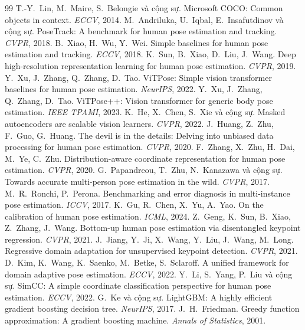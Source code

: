 \documentclass[11pt,a4paper]{article}
\begin{document}
\begin{thebibliography}{99}\small
{} T.-Y.~Lin, M.~Maire, S.~Belongie và cộng sự. Microsoft COCO: Common objects in context. \textit{ECCV}, 2014.
 M.~Andriluka, U.~Iqbal, E.~Insafutdinov và cộng sự. PoseTrack: A benchmark for human pose estimation and tracking. \textit{CVPR}, 2018.
 B.~Xiao, H.~Wu, Y.~Wei. Simple baselines for human pose estimation and tracking. \textit{ECCV}, 2018.
 K.~Sun, B.~Xiao, D.~Liu, J.~Wang. Deep high-resolution representation learning for human pose estimation. \textit{CVPR}, 2019.
 Y.~Xu, J.~Zhang, Q.~Zhang, D.~Tao. ViTPose: Simple vision transformer baselines for human pose estimation. \textit{NeurIPS}, 2022.
 Y.~Xu, J.~Zhang, Q.~Zhang, D.~Tao. ViTPose++: Vision transformer for generic body pose estimation. \textit{IEEE TPAMI}, 2023.
 K.~He, X.~Chen, S.~Xie và cộng sự. Masked autoencoders are scalable vision learners. \textit{CVPR}, 2022.
 J.~Huang, Z.~Zhu, F.~Guo, G.~Huang. The devil is in the details: Delving into unbiased data processing for human pose estimation. \textit{CVPR}, 2020.
 F.~Zhang, X.~Zhu, H.~Dai, M.~Ye, C.~Zhu. Distribution-aware coordinate representation for human pose estimation. \textit{CVPR}, 2020.
 G.~Papandreou, T.~Zhu, N.~Kanazawa và cộng sự. Towards accurate multi-person pose estimation in the wild. \textit{CVPR}, 2017.
 M.~R.~Ronchi, P.~Perona. Benchmarking and error diagnosis in multi-instance pose estimation. \textit{ICCV}, 2017.
 K.~Gu, R.~Chen, X.~Yu, A.~Yao. On the calibration of human pose estimation. \textit{ICML}, 2024.
 Z.~Geng, K.~Sun, B.~Xiao, Z.~Zhang, J.~Wang. Bottom-up human pose estimation via disentangled keypoint regression. \textit{CVPR}, 2021.
 J.~Jiang, Y.~Ji, X.~Wang, Y.~Liu, J.~Wang, M.~Long. Regressive domain adaptation for unsupervised keypoint detection. \textit{CVPR}, 2021.
 D.~Kim, K.~Wang, K.~Saenko, M.~Betke, S.~Sclaroff. A unified framework for domain adaptive pose estimation. \textit{ECCV}, 2022.
 Y.~Li, S.~Yang, P.~Liu và cộng sự. SimCC: A simple coordinate classification perspective for human pose estimation. \textit{ECCV}, 2022.
 G.~Ke và cộng sự. LightGBM: A highly efficient gradient boosting decision tree. \textit{NeurIPS}, 2017.
 J.~H.~Friedman. Greedy function approximation: A gradient boosting machine. \textit{Annals of Statistics}, 2001.
\end{thebibliography}
\end{document}
